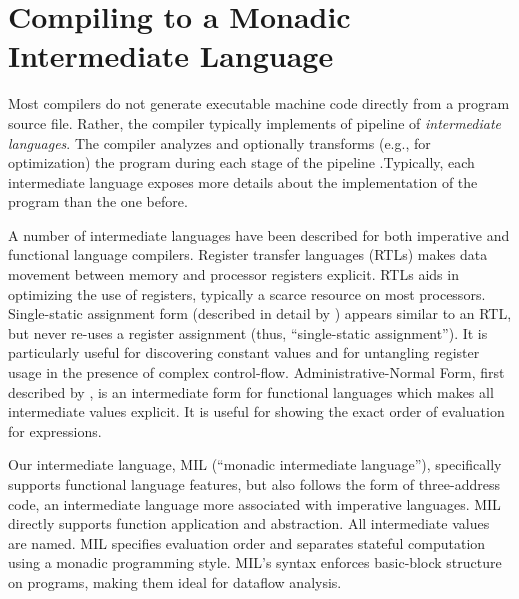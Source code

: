 \documentclass[12pt]{report}
\begin{document}


\chapter{Compiling to a Monadic Intermediate Language}
\label{ref_chapter_mil}








Most compilers do not generate executable machine code directly from a
program source file. Rather, the compiler typically implements of
pipeline of \emph{intermediate languages}. The compiler analyzes and
optionally transforms (e.g., for optimization) the program during each
stage of the pipeline .Typically, each intermediate language exposes
more details about the implementation of the program than the one
before.

A number of intermediate languages have been described for both
imperative and functional language compilers. Register transfer
languages (RTLs) makes data movement between memory and processor
registers explicit. RTLs aids in optimizing the use of registers,
typically a scarce resource on most processors. Single-static
assignment form (described in detail by \citet[pg.~252]{Muchnick1998})
appears similar to an RTL, but never re-uses a register assignment
(thus, ``single-static assignment''). It is particularly useful for
discovering constant values and for untangling register usage in the
presence of complex control-flow. Administrative-Normal Form, first
described by \citet{Flanagan1993}, is an intermediate form for
functional languages which makes all intermediate values explicit. It
is useful for showing the exact order of evaluation for expressions.

Our intermediate language, MIL (``monadic intermediate language''),
specifically supports functional language features, but also follows
the form of three-address code, an intermediate language more
associated with imperative languages. MIL directly supports function
application and abstraction. All intermediate values are named. MIL 
specifies evaluation order and separates stateful computation using a
monadic programming style. MIL's syntax enforces basic-block structure
on programs, making them ideal for dataflow analysis.
\end{document}
